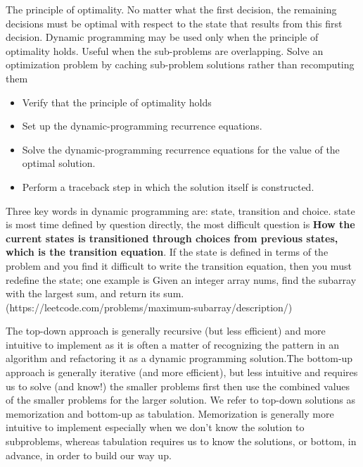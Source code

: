 \documentclass[a4paper,11pt,twoside]{book}
\begin{document}
	\par The principle of optimality. No matter what the first decision, the remaining decisions must be optimal with respect to the state that results from this first decision. Dynamic programming may be used only when the principle of optimality holds. Useful when the sub-problems are overlapping. Solve an optimization problem by caching  sub-problem solutions rather than recomputing them
	
	\begin{itemize}
		\item Verify that the principle of optimality holds  
				
		\item Set up the dynamic-programming recurrence equations.
		
		\item Solve the dynamic-programming recurrence equations for the value of the optimal solution.
		
		\item Perform a traceback step in which the solution itself is constructed.
	\end{itemize}
	

	

	
	
	
	
	\par Three key words in dynamic programming are: state, transition and choice. state is most time defined by question directly,  the most difficult question is \textbf{How the current states is transitioned through choices from previous states, which is the transition equation}. If the state is defined in terms of the problem and you find it difficult to write the transition equation, then you must redefine the state; one example is Given an integer array nums, find the 
	subarray with the largest sum, and return its sum. (https://leetcode.com/problems/maximum-subarray/description/)
	
	
	\par The top-down approach is generally recursive (but less efficient) and more intuitive to implement as it is often a matter of recognizing the pattern in an algorithm and refactoring it as a dynamic programming solution.The bottom-up approach is generally iterative (and more efficient), but less intuitive and requires us to solve (and know!) the smaller problems first then use the combined values of the smaller problems for the larger solution. We refer to top-down solutions as memorization and bottom-up as tabulation. Memorization is generally more intuitive to implement especially when we don’t know the solution to subproblems, whereas tabulation requires us to know the solutions, or bottom, in advance, in order to build our way up.
	
\end{document}
